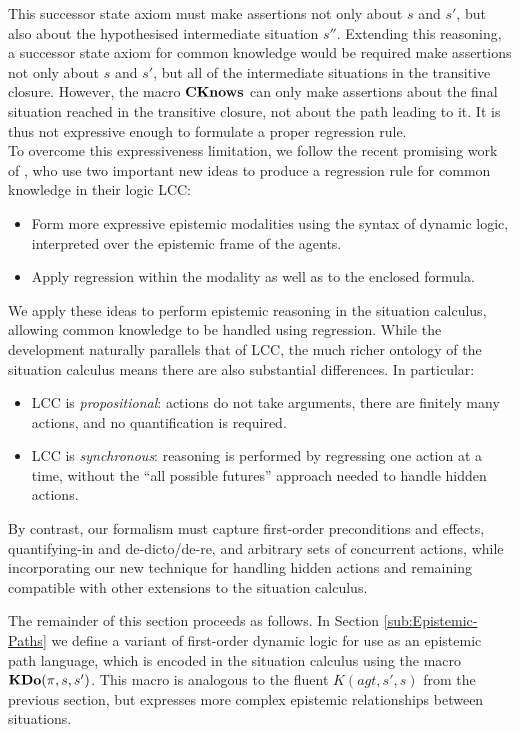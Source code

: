 This successor state axiom must make assertions not only about $s$
and $s'$, but also about the hypothesised intermediate situation
$s''$. Extending this reasoning, a successor state axiom for common
knowledge would be required make assertions not only about $s$ and
$s'$, but all of the intermediate situations in the transitive closure.
However, the macro $\mathbf{CKnows}$ can only make assertions about the final
situation reached in the transitive closure, not about the path leading
to it. It is thus not expressive enough to formulate a proper regression
rule.\\


To overcome this expressiveness limitation, we follow the recent promising
work of \citep{vanBenthem06lcc}, who use two important new ideas
to produce a regression rule for common knowledge in their logic LCC:

\begin{itemize}
\item Form more expressive epistemic modalities using the syntax of dynamic
logic, interpreted over the epistemic frame of the agents. 
\item Apply regression within the modality as well as to the enclosed formula. 
\end{itemize}
We apply these ideas to perform epistemic reasoning in the situation
calculus, allowing common knowledge to be handled using regression.
While the development naturally parallels that of LCC, the much richer
ontology of the situation calculus means there are also substantial
differences. In particular:

\begin{itemize}
\item LCC is \emph{propositional}: actions do not take arguments, there
are finitely many actions, and no quantification is required. 
\item LCC is \emph{synchronous}: reasoning is performed by regressing one
action at a time, without the {}``all possible futures'' approach
needed to handle hidden actions. 
\end{itemize}
By contrast, our formalism must capture first-order preconditions
and effects, quantifying-in and de-dicto/de-re, and arbitrary sets
of concurrent actions, while incorporating our new technique for handling
hidden actions and remaining compatible with other extensions to the
situation calculus.

The remainder of this section proceeds as follows. In Section \ref{sub:Epistemic-Paths}
we define a variant of first-order dynamic logic for use as an epistemic
path language, which is encoded in the situation calculus using the
macro $\mathbf{KDo}(\pi,s,s')$. This macro is analogous to the fluent $K(agt,s',s)$
from the previous section, but expresses more complex epistemic relationships
between situations.

